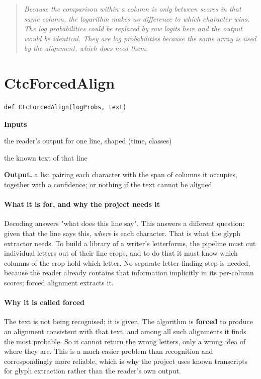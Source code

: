 \begin{quote}\small\itshape Because the comparison within a column is only between scores in that same column, the logarithm makes no difference to which character wins. The log probabilities could be replaced by raw logits here and the output would be identical. They are log probabilities because the same array is used by the alignment, which does need them.\end{quote}

\section{CtcForcedAlign}
\begin{lstlisting}[style=sig]
def CtcForcedAlign(logProbs, text)
\end{lstlisting}

\noindent\textbf{Inputs}
\begin{description}[leftmargin=2.2em,style=nextline,font=\normalfont\ttfamily]\setlength\itemsep{1pt}
  \item[{logProbs}] \normalfont the reader's output for one line, shaped (time, classes)
  \item[{text}] \normalfont the known text of that line
\end{description}

\noindent\textbf{Output.} a list pairing each character with the span of columns it occupies, together with a confidence; or nothing if the text cannot be aligned.


\paragraph{What it is for, and why the project needs it}
Decoding answers "what does this line say". This answers a different question: given that the line says this, \emph{where} is each character. That is what the glyph extractor needs. To build a library of a writer's letterforms, the pipeline must cut individual letters out of their line crops, and to do that it must know which columns of the crop hold which letter. No separate letter-finding step is needed, because the reader already contains that information implicitly in its per-column scores; forced alignment extracts it.


\paragraph{Why it is called forced}
The text is not being recognised; it is given. The algorithm is \textbf{forced} to produce an alignment consistent with that text, and among all such alignments it finds the most probable. So it cannot return the wrong letters, only a wrong idea of where they are. This is a much easier problem than recognition and correspondingly more reliable, which is why the project uses known transcripts for glyph extraction rather than the reader's own output.


